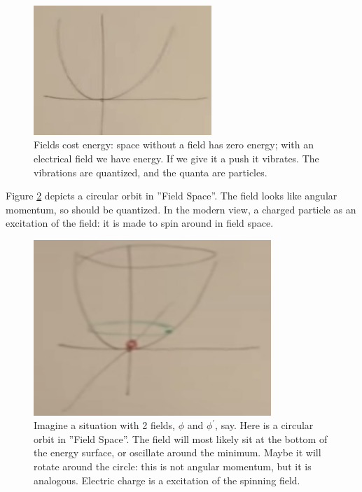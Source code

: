 \documentclass[]{article}
\begin{document}
\begin{figure}[H]
	\begin{center}
		\caption[Fields cost energy]{Fields cost energy: space without a field has zero energy; with an electrical field we have energy. If we give it a push it vibrates. The vibrations are quantized, and the quanta are particles. }\label{fig:higgs-fields-cost-energy}
		\includegraphics[width=0.6\textwidth]{higgs-fields-cost-energy}
	\end{center}
\end{figure}

Figure \ref{fig:2-appendix-field-circle} depicts a circular orbit in ''Field Space''. The field looks like angular momentum, so should be quantized. In the modern view,  a charged particle as an excitation of the field: it is made to spin around in field space.

\begin{figure}[H]
	\begin{center}
		\caption[Imagine a situation with 2 fields, $\phi$ and $\phi^{\prime}$, say.]{Imagine a situation with 2 fields, $\phi$ and $\phi^{\prime}$, say. Here is a circular orbit in ''Field Space''. The field will most likely sit at the bottom of the energy surface, or oscillate around the minimum. Maybe it will rotate around the circle: this is not angular momentum, but it is analogous. Electric charge is a excitation of the spinning field.}\label{fig:2-appendix-field-circle}
		\includegraphics[width=0.8\textwidth]{2-appendix-field-circle}
	\end{center}
\end{figure}
\end{document}
